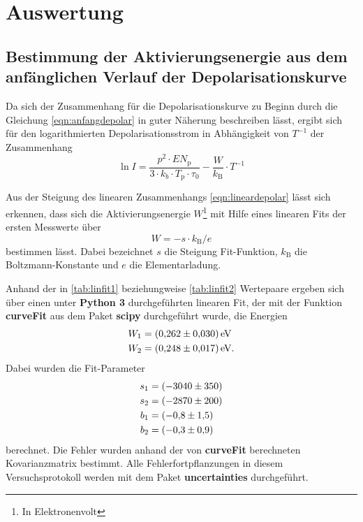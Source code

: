 \section{Auswertung}
\label{sec:Auswertung}

\subsection{Bestimmung der Aktivierungsenergie aus dem anfänglichen Verlauf der Depolarisationskurve}
\label{subsec:method1}
Da sich der Zusammenhang für die Depolarisationskurve zu Beginn durch die Gleichung \eqref{eqn:anfangdepolar} in guter Näherung
beschreiben lässt, ergibt sich für den logarithmierten Depolarisationsstrom in Abhängigkeit von $T^{-1}$ der Zusammenhang
\\
\begin{equation}
  \label{eqn:lineardepolar}
  \ln{I} = \frac{p^2 \cdot E N_\text{p} }{3 \cdot k_{b}
   \cdot T_\text{p} \cdot \tau_{0}} -\frac{W}{k_{\text{B}}} \cdot T^{-1}
\end{equation}

Aus der Steigung des linearen Zusammenhangs \eqref{eqn:lineardepolar} lässt sich erkennen, dass sich
die Aktivierungsenergie $W$\footnote{In Elektronenvolt} mit Hilfe eines linearen Fits der ersten Messwerte über
\\
\begin{equation}
  \label{eqn:W}
  W = -s \cdot k_\text{B} / e
\end{equation}
bestimmen lässt. Dabei bezeichnet $s$ die Steigung Fit-Funktion, $k_\text{B}$ die Boltzmann-Konstante und $e$ die Elementarladung.

Anhand der in \ref{tab:linfit1} beziehungweise \ref{tab:linfit2} Wertepaare ergeben sich über einen unter \textbf{Python 3}
durchgeführten linearen Fit, der mit der Funktion \textbf{curveFit} aus
dem Paket \textbf{scipy} durchgeführt wurde, die Energien
\\
\begin{align*}
  W_{1} &= \SI{0.262+-0.030}{\electronvolt} \\
  W_{2} &= \SI{0.248+-0.017}{\electronvolt}.
\end{align*}
Dabei wurden die Fit-Parameter
\\
\begin{align*}
  s_{1} &= \SI{-3040+-350}{}\\
  s_{2} &= \SI{-2870+-200}{}\\
  b_{1} &= \SI{-0.8+-1.5}{}\\
  b_{2} &= \SI{-0.3+-0.9}{}
\end{align*}
berechnet.
Die Fehler wurden anhand der von \textbf{curveFit} berechneten Kovarianzmatrix bestimmt. Alle Fehlerfortpflanzungen in diesem Versuchsprotokoll
werden mit dem Paket \textbf{uncertainties}\cite{uncertainties} durchgeführt.

